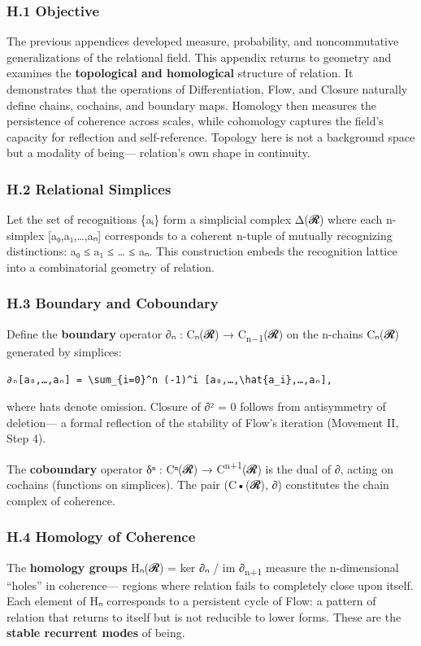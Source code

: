 \documentclass[11pt]{article}
\begin{document}
\subsubsection*{H.1 Objective}
\label{sec:orge998fee}
The previous appendices developed measure, probability, and noncommutative generalizations  
of the relational field. This appendix returns to geometry and examines  
the \textbf{topological and homological} structure of relation.  
It demonstrates that the operations of Differentiation, Flow, and Closure  
naturally define chains, cochains, and boundary maps.  
Homology then measures the persistence of coherence across scales,  
while cohomology captures the field’s capacity for reflection and self-reference.  
Topology here is not a background space but a modality of being—  
relation’s own shape in continuity.
\subsubsection*{H.2 Relational Simplices}
\label{sec:org6ad2a0c}
Let the set of recognitions \{aᵢ\} form a simplicial complex Δ(𝓡)  
where each n-simplex [a₀,a₁,…,aₙ] corresponds to  
a coherent n-tuple of mutually recognizing distinctions:  
a₀ ≤ a₁ ≤ … ≤ aₙ.  
This construction embeds the recognition lattice  
into a combinatorial geometry of relation.
\subsubsection*{H.3 Boundary and Coboundary}
\label{sec:orgdd7019f}
Define the \textbf{boundary} operator  
∂ₙ : Cₙ(𝓡) → C\textsubscript{n−1}(𝓡)  
on the n-chains Cₙ(𝓡) generated by simplices:

\begin{verbatim}
∂ₙ[a₀,…,aₙ] = \sum_{i=0}^n (-1)^i [a₀,…,\hat{a_i},…,aₙ],
\end{verbatim}

where hats denote omission.  
Closure of ∂² = 0 follows from antisymmetry of deletion—  
a formal reflection of the stability of Flow’s iteration (Movement II, Step 4).  

The \textbf{coboundary} operator δⁿ : Cⁿ(𝓡) → C\textsuperscript{n+1}(𝓡)  
is the dual of ∂, acting on cochains (functions on simplices).  
The pair (C•(𝓡), ∂) constitutes the chain complex of coherence.
\subsubsection*{H.4 Homology of Coherence}
\label{sec:org414aee6}
The \textbf{homology groups} Hₙ(𝓡) = ker ∂ₙ / im ∂\textsubscript{n+1}  
measure the n-dimensional “holes” in coherence—  
regions where relation fails to completely close upon itself.  
Each element of Hₙ corresponds to a persistent cycle of Flow:  
a pattern of relation that returns to itself but is not reducible to lower forms.  
These are the \textbf{stable recurrent modes} of being.
\end{document}
